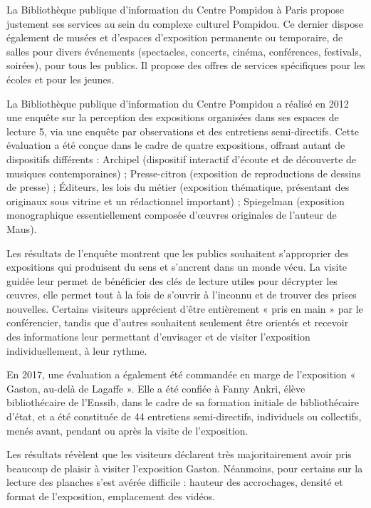 \documentclass[french,a4paper,12pt]{article}
\begin{document}
La Bibliothèque publique d’information du Centre Pompidou à Paris propose justement ses services au sein du complexe culturel Pompidou. Ce dernier dispose également de musées et d’espaces d’exposition permanente ou temporaire, de salles pour divers événements (spectacles, concerts, cinéma, conférences, festivals, soirées), pour tous les publics. Il propose des offres de services spécifiques pour les écoles et pour les jeunes\citep{expositions2012}. 

\quad La Bibliothèque publique d’information du Centre Pompidou a réalisé en 2012 une enquête sur la perception des expositions organisées dans ses espaces de lecture 5, via une enquête par observations et des entretiens semi-directifs. Cette évaluation a été conçue dans le cadre de quatre expositions, offrant autant de dispositifs différents : Archipel (dispositif interactif d’écoute et de découverte de musiques contemporaines) ; Presse-citron (exposition de reproductions de dessins de presse) ; Éditeurs, les lois du métier (exposition thématique, présentant des originaux sous vitrine et un rédactionnel important) ; Spiegelman (exposition monographique essentiellement composée d’œuvres originales de l’auteur de Maus). 

Les résultats de l’enquête montrent que les publics souhaitent s’approprier des expositions qui produisent du sens et s’ancrent dans un monde vécu. La visite guidée leur permet de bénéficier des clés de lecture utiles pour décrypter les œuvres, elle permet tout à la fois de s’ouvrir à l’inconnu et de trouver des prises nouvelles. Certains visiteurs apprécient d’être entièrement « pris en main » par le conférencier, tandis que d’autres souhaitent seulement être orientés et recevoir des informations leur permettant d'envisager et de visiter l’exposition individuellement, à leur rythme. 

\quad En 2017, une évaluation a également été commandée en marge de l’exposition « Gaston, au-delà de Lagaffe »\citep{gaston2019}. Elle a été confiée à Fanny Ankri, élève bibliothécaire de l’Enssib, dans le cadre de sa formation initiale de bibliothécaire d’état, et a été constituée de 44 entretiens semi-directifs, individuels ou collectifs, menés avant, pendant ou après la visite de l’exposition.  

Les résultats révèlent que les visiteurs déclarent très majoritairement avoir pris beaucoup de plaisir à visiter l’exposition Gaston. Néanmoins, pour certains sur la lecture des planches s'est avérée difficile : hauteur des accrochages, densité et format de l’exposition, emplacement des vidéos.  
\end{document}

